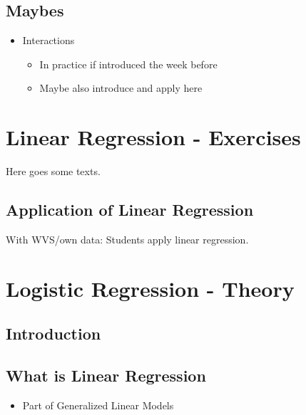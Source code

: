 \documentclass[
]{book}
\providecommand{\tightlist}{%
  \setlength{\itemsep}{0pt}\setlength{\parskip}{0pt}}
\begin{document}
\hypertarget{maybes-1}{%
\section{Maybes}\label{maybes-1}}

\begin{itemize}
\tightlist
\item
  Interactions

  \begin{itemize}
  \tightlist
  \item
    In practice if introduced the week before
  \item
    Maybe also introduce and apply here
  \end{itemize}
\end{itemize}

\hypertarget{lin-e}{%
\chapter{Linear Regression - Exercises}\label{lin-e}}

Here goes some texts.

\hypertarget{application-of-linear-regression}{%
\section{Application of Linear Regression}\label{application-of-linear-regression}}

With WVS/own data: Students apply linear regression.

\hypertarget{log-t}{%
\chapter{Logistic Regression - Theory}\label{log-t}}

\hypertarget{introduction-1}{%
\section{Introduction}\label{introduction-1}}

\hypertarget{what-is-linear-regression-1}{%
\section{What is Linear Regression}\label{what-is-linear-regression-1}}

\begin{itemize}
\tightlist
\item
  Part of Generalized Linear Models
\end{itemize}
\end{document}
